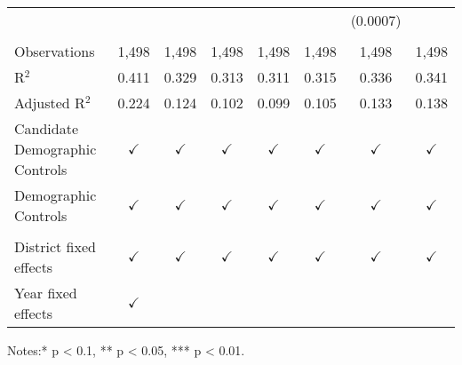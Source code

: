\begin{table}[htbp]
\begin{tabular}{lccccccc}
                                     &               &               &               &               &                & (0.0007)       &   \\   
       \\
      Observations                   & 1,498         & 1,498         & 1,498         & 1,498         & 1,498          & 1,498          & 1,498\\  
      R$^2$                          & 0.411         & 0.329         & 0.313         & 0.311         & 0.315          & 0.336          & 0.341\\  
      Adjusted R$^2$                 & 0.224         & 0.124         & 0.102         & 0.099         & 0.105          & 0.133          & 0.138\\  
      Candidate Demographic Controls & $\checkmark$  & $\checkmark$  & $\checkmark$  & $\checkmark$  & $\checkmark$   & $\checkmark$   & $\checkmark$\\   
      Demographic Controls           & $\checkmark$  & $\checkmark$  & $\checkmark$  & $\checkmark$  & $\checkmark$   & $\checkmark$   & $\checkmark$\\   
       \\
      District fixed effects         & $\checkmark$  & $\checkmark$  & $\checkmark$  & $\checkmark$  & $\checkmark$   & $\checkmark$   & $\checkmark$\\   
      Year fixed effects             & $\checkmark$  &               &               &               &                &                & \\  
      \bottomrule
   \end{tabular}
   
   \par \raggedright 
   \footnotesize Notes:* p < 0.1, ** p < 0.05, *** p < 0.01. 
\end{table}


